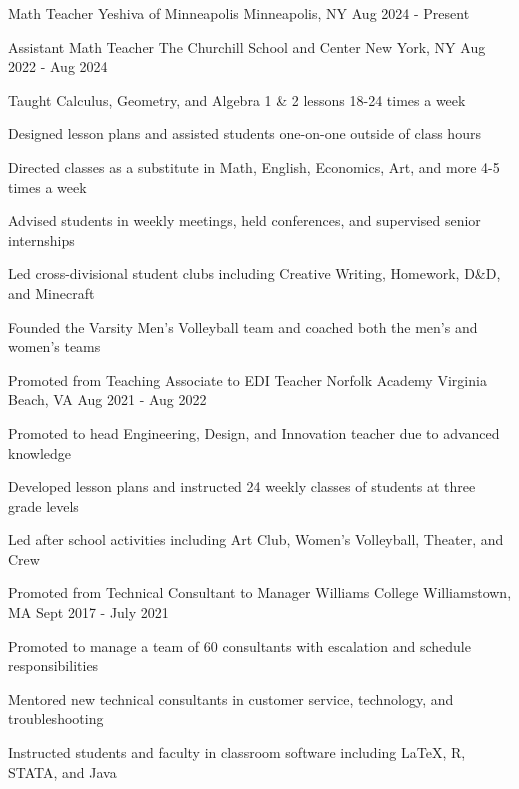 \begin{cventries}
  \cventry
  {Math Teacher}
  {Yeshiva of Minneapolis}
  {Minneapolis, NY}
  {Aug 2024 - Present}
  {}

  \cventry
  {Assistant Math Teacher}
  {The Churchill School and Center}
  {New York, NY}
  {Aug 2022 - Aug 2024}
  {
    \begin{cvitems}
      \item {Taught Calculus, Geometry, and Algebra 1 \& 2 lessons 18-24 times a week}
      \item {Designed lesson plans and assisted students one-on-one outside of class hours}
      \item {Directed classes as a substitute in Math, English, Economics, Art, and more 4-5 times a week}
      \item {Advised students in weekly meetings, held conferences, and supervised senior internships}
      \item {Led cross-divisional student clubs including Creative Writing, Homework, D\&D, and Minecraft}
      \item {Founded the Varsity Men's Volleyball team and coached both the men's and women's teams}
    \end{cvitems}
  }

  \cventry
  {Promoted from Teaching Associate to EDI Teacher}
  {Norfolk Academy}
  {Virginia Beach, VA}
  {Aug 2021 - Aug 2022}
  {
    \begin{cvitems}
      \item {Promoted to head Engineering, Design, and Innovation teacher due to advanced knowledge}
      \item {Developed lesson plans and instructed 24 weekly classes of students at three grade levels}
      \item {Led after school activities including Art Club, Women's Volleyball, Theater, and Crew}
    \end{cvitems}
  }

  \cventry
  {Promoted from Technical Consultant to Manager}
  {Williams College}
  {Williamstown, MA}
  {Sept 2017 - July 2021}
  {
    \begin{cvitems}
      \item {Promoted to manage a team of 60 consultants with escalation and schedule responsibilities}
      \item {Mentored new technical consultants in customer service, technology, and troubleshooting}
      \item {Instructed students and faculty in classroom software including LaTeX, R, STATA, and Java}
    \end{cvitems}
  }


\end{cventries}
